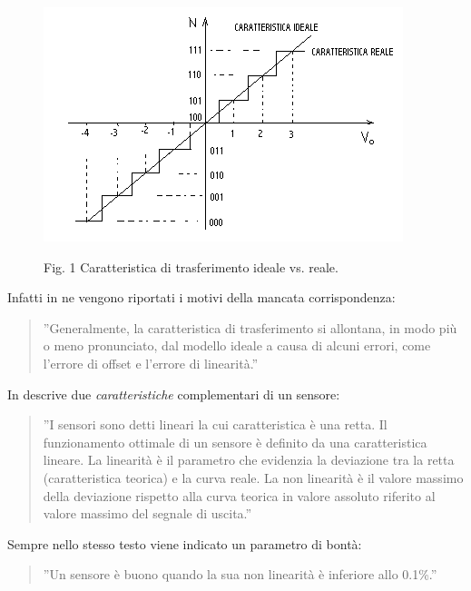 \documentclass[a4paper]{report} %
\begin{document}
\begin{figure}
\centering
\includegraphics[scale=.8]{Immagini/CarTrasferimento.png}

Fig. 1 Caratteristica di trasferimento ideale vs. reale. \cite{art:rif.19}
\end{figure}

Infatti in \cite{art:rif.1} ne vengono riportati i motivi della mancata corrispondenza:
\begin{quote} 
	''Generalmente, la caratteristica di trasferimento si allontana, in modo più o meno pronunciato, dal modello ideale a causa di alcuni errori, come l'errore di offset e l'errore di linearità.''
\end{quote}


In \cite{art:rif.11} descrive due \textit{caratteristiche} complementari di un sensore:
\begin{quote}
	''I sensori sono detti lineari la cui caratteristica è una retta. Il funzionamento ottimale di un sensore è definito da una caratteristica lineare. La linearità è il parametro che evidenzia la deviazione tra la retta (caratteristica teorica) e la curva reale. 
	La non linearità è il valore massimo della deviazione rispetto alla curva teorica in valore assoluto riferito al valore massimo del segnale di uscita.''
\end{quote} 
Sempre nello stesso testo viene indicato un parametro di bontà:	
\begin{quote}
	''Un sensore è buono quando la sua non linearità è inferiore allo 0.1\%.''
\end{quote}
\end{document}
